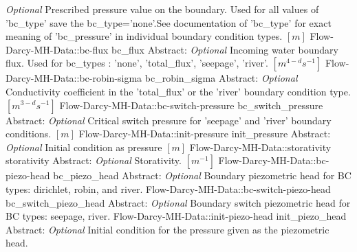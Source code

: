 \begin{RecordType}
			{ \it{Optional} }
			{{{Prescribed pressure value on the boundary. Used for all values of 'bc{\_}type' save the bc{\_}type='none'.See documentation of 'bc{\_}type' for exact meaning of 'bc{\_}pressure' in individual boundary condition types. }{$[m]$}}}
		\RecKey
			{Flow-Darcy-MH-Data::bc-flux}
			{bc{\_}flux}
			{{Abstract}{: }}
			{ \it{Optional} }
			{{{Incoming water boundary flux. Used for bc{\_}types : 'none', 'total{\_}flux', 'seepage', 'river'. }{$[m^{4-d}s^{-1}]$}}}
		\RecKey
			{Flow-Darcy-MH-Data::bc-robin-sigma}
			{bc{\_}robin{\_}sigma}
			{{Abstract}{: }}
			{ \it{Optional} }
			{{{Conductivity coefficient in the 'total{\_}flux' or the 'river' boundary condition type. }{$[m^{3-d}s^{-1}]$}}}
		\RecKey
			{Flow-Darcy-MH-Data::bc-switch-pressure}
			{bc{\_}switch{\_}pressure}
			{{Abstract}{: }}
			{ \it{Optional} }
			{{{Critical switch pressure for 'seepage' and 'river' boundary conditions. }{$[m]$}}}
		\RecKey
			{Flow-Darcy-MH-Data::init-pressure}
			{init{\_}pressure}
			{{Abstract}{: }}
			{ \it{Optional} }
			{{{Initial condition as pressure }{$[m]$}}}
		\RecKey
			{Flow-Darcy-MH-Data::storativity}
			{storativity}
			{{Abstract}{: }}
			{ \it{Optional} }
			{{{Storativity. }{$[m^{-1}]$}}}
		\RecKey
			{Flow-Darcy-MH-Data::bc-piezo-head}
			{bc{\_}piezo{\_}head}
			{{Abstract}{: }}
			{ \it{Optional} }
			{{{Boundary piezometric head for BC types: dirichlet, robin, and river.}}}
		\RecKey
			{Flow-Darcy-MH-Data::bc-switch-piezo-head}
			{bc{\_}switch{\_}piezo{\_}head}
			{{Abstract}{: }}
			{ \it{Optional} }
			{{{Boundary switch piezometric head for BC types: seepage, river.}}}
		\RecKey
			{Flow-Darcy-MH-Data::init-piezo-head}
			{init{\_}piezo{\_}head}
			{{Abstract}{: }}
			{ \it{Optional} }
			{{{Initial condition for the pressure given as the piezometric head.}}}
\end{RecordType}
